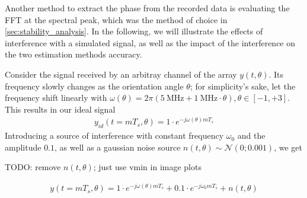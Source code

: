 Another method to extract the phase from the recorded data is evaluating the FFT at the spectral peak,
which was the method of choice in \ref{sec:stability_analysis}.
In the following, we will illustrate the effects of interference with a simulated signal,
as well as the impact of the interference on the two estimation methods accuracy.

Consider the signal received by an arbitray channel of the array $y(t,\theta)$.
Its frequency slowly changes as the orientation angle $\theta$;
for simplicity's sake, let the frequency shift linearly with $\omega(\theta)=2\pi (\SI{5}{\MHz} + \SI{1}{\MHz} \cdot \theta), \theta \in [-1,+3]$.
This results in our ideal signal
\begin{align*}
    y_{id}(t=mT_s,\theta) = 1 \cdot e^{-j\omega(\theta)mT_s}
\end{align*}
Introducing a source of interference with constant frequency $\omega_0$ and the amplitude $0.1$,
as well as a gaussian noise source $n(t,\theta) \sim \mathcal{N}(0;0.001)$,  we get

TODO: remove $n(t,\theta)$; just use vmin in image plots

\begin{align*}
    y(t=mT_s,\theta) = 1 \cdot e^{-j\omega(\theta)mT_s} + 0.1 \cdot e^{-j\omega_0 mT_s} + n(t,\theta)
\end{align*}

